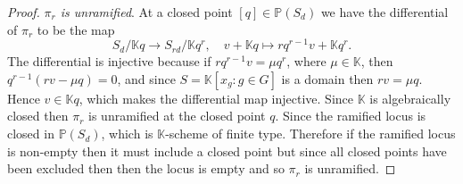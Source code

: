\documentclass[final]{article}
\newcommand{\K}{\mathbb{K}}
\newcommand{\PP}{\mathbb{P}}
\theoremstyle{definition}
\theoremstyle{plain}
\begin{document}
\begin{proof}
\emph{$\pi_r$ is unramified}. At a closed point $[q] \in \PP(S_d)$ we have the differential of $\pi_r$ to be the map 
\[
S_d/\K q \to S_{rd}/\K q^r, \quad v + \K q \mapsto rq^{r-1}v + \K q^r.
\]
The differential is injective because if $rq^{r-1} v = \mu q^r$, where $\mu \in \K$, then $q^{r-1}(rv - \mu q) = 0$, and since $S = \K[x_g: g\in G]$ is a domain then $rv = \mu q$. Hence $v \in \K q$, which makes the differential map injective. 
Since $\K$ is algebraically closed then $\pi_r$ is unramified at the closed point $q$.
Since the ramified locus is closed in $\PP(S_d)$, which is $\K$-scheme of finite type. Therefore if the ramified locus is non-empty then it must include a closed point but since all closed points have been excluded then then the locus is empty and so $\pi_r$ is unramified.
\end{proof}
\end{document}
